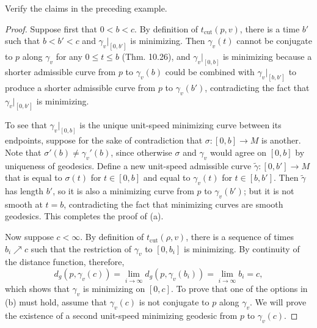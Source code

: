 \begin{exercise}
\label{exer:verify-cut-loci-claims}

Verify the claims in the preceding example.

\end{exercise}
\begin{proof}
Suppose first that $0 < b < c$. By definition of $t_{\text{cut}}(p, v)$, there is a time $b'$ such that $b < b' < c$ and $\gamma_v|_{[0,b']}$ is minimizing. Then $\gamma_v(t)$ cannot be conjugate to $p$ along $\gamma_v$ for any $0 \le t \le b$ (Thm. 10.26), and $\gamma_v|_{[0,b]}$ is minimizing because a shorter admissible curve from $p$ to $\gamma_v(b)$ could be combined with $\gamma_v|_{[b,b']}$ to produce a shorter admissible curve from $p$ to $\gamma_v(b')$, contradicting the fact that $\gamma_v|_{[0,b']}$ is minimizing.

To see that $\gamma_v|_{[0,b]}$ is the unique unit-speed minimizing curve between its endpoints, suppose for the sake of contradiction that $\sigma: [0, b] \to M$ is another. Note that $\sigma'(b) \ne \gamma_v'(b)$, since otherwise $\sigma$ and $\gamma_v$ would agree on $[0, b]$ by uniqueness of geodesics. Define a new unit-speed admissible curve $\tilde{\gamma}: [0, b'] \to M$ that is equal to $\sigma(t)$ for $t \in [0, b]$ and equal to $\gamma_v(t)$ for $t \in [b, b']$. Then $\tilde{\gamma}$ has length $b'$, so it is also a minimizing curve from $p$ to $\gamma_v(b')$; but it is not smooth at $t = b$, contradicting the fact that minimizing curves are smooth geodesics. This completes the proof of (a).

Now suppose $c < \infty$. By definition of $t_{\text{cut}}(\rho, v)$, there is a sequence of times $b_i \nearrow c$ such that the restriction of $\gamma_v$ to $[0,b_i]$ is minimizing. By continuity of the distance function, therefore,
\[d_g(p, \gamma_v(c)) = \lim_{i \to \infty} d_g(p, \gamma_v(b_i)) = \lim_{i \to \infty} b_i = c,\]
which shows that $\gamma_v$ is minimizing on $[0,c]$. To prove that one of the options in (b) must hold, assume that $\gamma_v(c)$ is not conjugate to $p$ along $\gamma_v$. We will prove the existence of a second unit-speed minimizing geodesic from $p$ to $\gamma_v(c)$.


\end{proof}
